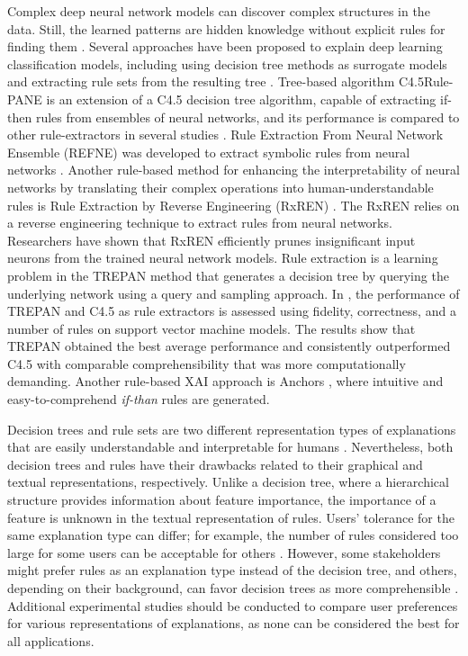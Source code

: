 Complex deep neural network models can discover complex structures in the data. Still, the learned patterns are hidden knowledge without explicit rules for finding them \cite{ali}. Several approaches have been proposed to explain deep learning classification models, including using decision tree methods as surrogate models and extracting rule sets from the resulting tree \citep{DT_surrogate}. Tree-based algorithm C4.5Rule-PANE \citep{c45} is an extension of a C4.5 decision tree algorithm, capable of extracting if-then rules from ensembles of neural networks, and its performance is compared to other rule-extractors in several studies \citep{giulia_2020, giulia_2021}. Rule Extraction From Neural Network Ensemble (REFNE) was developed to extract symbolic rules from neural networks \citep{refne}. Another rule-based method for enhancing the interpretability of neural networks by translating their complex operations into human-understandable rules is Rule Extraction by Reverse Engineering (RxREN) \citep{rxren}. The RxREN relies on a reverse engineering technique to extract rules from neural networks. Researchers \citep{rxren} have shown that RxREN efficiently prunes insignificant input neurons from the trained neural network models. Rule extraction is a learning problem in the TREPAN \citep{trepan} method that generates a decision tree by querying the underlying network using a query and sampling approach. In \citep{svm_rules}, the performance of TREPAN and C4.5 as rule extractors is assessed using fidelity, correctness, and a number of rules on support vector machine models. The results show that TREPAN obtained the best average performance and consistently outperformed C4.5 with comparable comprehensibility that was more computationally demanding. Another rule-based XAI approach is Anchors \citep{Anchors}, where intuitive and easy-to-comprehend \textit{if-than} rules are generated. 

Decision trees and rule sets are two different representation types of explanations that are easily understandable and interpretable for humans \citep{Guidotti2019}. Nevertheless, both decision trees and rules have their drawbacks \citep{ribeiro2016} related to their graphical and textual representations, respectively. Unlike a decision tree, where a hierarchical structure provides information about feature importance, the importance of a feature is unknown in the textual representation of rules. Users' tolerance for the same explanation type can differ; for example, the number of rules considered too large for some users can be acceptable for others \citep{freitas}. However, some stakeholders might prefer rules as an explanation type instead of the decision tree, and others, depending on their background, can favor decision trees as more comprehensible \citep{ribeiro2016}. Additional experimental studies should be conducted to compare user preferences for various representations of explanations, as none can be considered the best for all applications.

